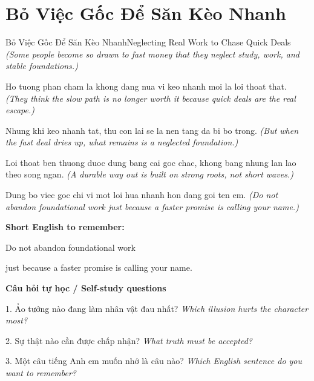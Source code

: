 \section{Bỏ Việc Gốc Để Săn Kèo Nhanh}
\begin{truyen}{Bỏ Việc Gốc Để Săn Kèo Nhanh}{Neglecting Real Work to Chase Quick Deals}
\textit{(Some people become so drawn to fast money that they neglect study, work, and stable foundations.)}

Ho tuong phan cham la khong dang nua vi keo nhanh moi la loi thoat that.
\textit{(They think the slow path is no longer worth it because quick deals are the real escape.)}

Nhung khi keo nhanh tat, thu con lai se la nen tang da bi bo trong.
\textit{(But when the fast deal dries up, what remains is a neglected foundation.)}

Loi thoat ben thuong duoc dung bang cai goc chac, khong bang nhung lan lao theo song ngan.
\textit{(A durable way out is built on strong roots, not short waves.)}

\end{truyen}

\begin{baihoc}
Dung bo viec goc chi vi mot loi hua nhanh hon dang goi ten em.
\textit{(Do not abandon foundational work just because a faster promise is calling your name.)}
\end{baihoc}

\begin{ghinhoanh}
\textbf{Short English to remember:}

Do not abandon foundational work

just because a faster promise is calling your name.

\end{ghinhoanh}

\begin{tuhocnhanh}
\textbf{Câu hỏi tự học / Self-study questions}

1. Ảo tưởng nào đang làm nhân vật đau nhất? \textit{Which illusion hurts the character most?}

2. Sự thật nào cần được chấp nhận? \textit{What truth must be accepted?}

3. Một câu tiếng Anh em muốn nhớ là câu nào? \textit{Which English sentence do you want to remember?}
\end{tuhocnhanh}
\ngancach

